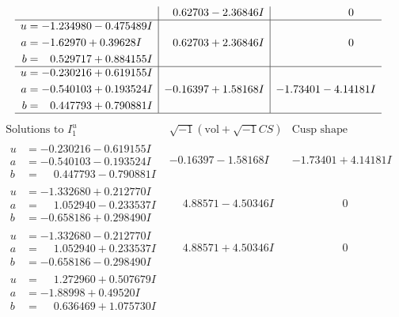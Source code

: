 \documentclass[1p]{elsarticle_modified}
\theoremstyle{definition}
\newcommand{\I}{\sqrt{-1}}
\begin{document}
$$\begin{array}{c|c|c}
 & \phantom{-}0.62703 - 2.36846 I & \phantom{-0.000000 } 0 \\ \hline\begin{aligned}
u &= -1.234980 - 0.475489 I \\
a &= -1.62970 + 0.39628 I \\
b &= \phantom{-}0.529717 + 0.884155 I\end{aligned}
 & \phantom{-}0.62703 + 2.36846 I & \phantom{-0.000000 } 0 \\ \hline\begin{aligned}
u &= -0.230216 + 0.619155 I \\
a &= -0.540103 + 0.193524 I \\
b &= \phantom{-}0.447793 + 0.790881 I\end{aligned}
 & -0.16397 + 1.58168 I & -1.73401 - 4.14181 I\\
 \hline 
 \end{array}$$\newpage$$\begin{array}{c|c|c}  
\text{Solutions to }I^u_{1}& \I (\text{vol} + \sqrt{-1}CS) & \text{Cusp shape}\\
 \hline 
\begin{aligned}
u &= -0.230216 - 0.619155 I \\
a &= -0.540103 - 0.193524 I \\
b &= \phantom{-}0.447793 - 0.790881 I\end{aligned}
 & -0.16397 - 1.58168 I & -1.73401 + 4.14181 I \\ \hline\begin{aligned}
u &= -1.332680 + 0.212770 I \\
a &= \phantom{-}1.052940 - 0.233537 I \\
b &= -0.658186 + 0.298490 I\end{aligned}
 & \phantom{-}4.88571 - 4.50346 I & \phantom{-0.000000 } 0 \\ \hline\begin{aligned}
u &= -1.332680 - 0.212770 I \\
a &= \phantom{-}1.052940 + 0.233537 I \\
b &= -0.658186 - 0.298490 I\end{aligned}
 & \phantom{-}4.88571 + 4.50346 I & \phantom{-0.000000 } 0 \\ \hline\begin{aligned}
u &= \phantom{-}1.272960 + 0.507679 I \\
a &= -1.88998 + 0.49520 I \\
b &= \phantom{-}0.636469 + 1.075730 I\end{aligned}

\end{array}$$
\end{document}
